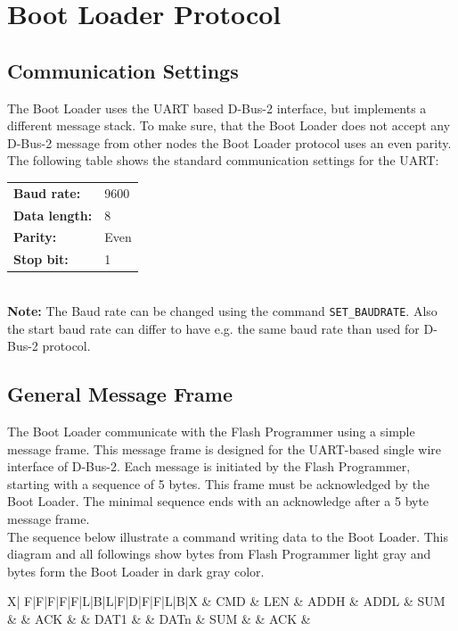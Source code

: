 \documentclass[a4paper,british,oneside,12pt]{scrartcl}
\newlength{\tabcolsepBak}
\newlength{\arrayrulewidthBak}
\newcommand{\mkMsgFrame}[4][]{
\setlength\tabcolsep{1pt}
\renewcommand\arraystretch{1.3}
\setlength\arrayrulewidth{1pt}
 \vspace{8pt}
 \noindent
 \begin{tabular}
   {X|#2|X}
  	\hline
  	& #3 &\tabularnewline
  	#4
  	#1
 \end{tabular}
 \vspace{8pt}
 \setlength\tabcolsep{\tabcolsepBak}
 \renewcommand\arraystretch{1.0}
 \setlength\arrayrulewidth{\arrayrulewidthBak}
}
\begin{document}



\newpage
\section{Boot Loader Protocol}
\label{sec:BootLoaderProtocol}
\subsection{Communication Settings}
The Boot Loader uses the UART based D-Bus-2 interface, but implements a different message stack. To make sure, that the Boot Loader does not accept any D-Bus-2 message from other nodes the Boot Loader protocol uses an even parity. The following table shows the standard communication settings for the UART:\\[0.5cm]
\noindent{}\sffamily
\begin{tabular}{ll}
		\textbf{Baud rate:}   & 9600\\
	  \textbf{Data length:} & 8\\		
		\textbf{Parity:}      & Even\\
		\textbf{Stop bit:}    & 1
\end{tabular}\\[0.5cm]
\normalfont
\textbf{Note:} The Baud rate can be changed using the command \texttt{SET_BAUDRATE}. Also the start baud rate can differ to have e.g. the same baud rate than used for D-Bus-2 protocol.
\pagebreak[0]
\normalfont

\subsection{General Message Frame}
\label{sec:BootLoaderMsgFrame}
The Boot Loader communicate with the Flash Programmer using a simple message frame. This message frame is designed for the UART-based single wire interface of D-Bus-2. Each message is initiated by the Flash Programmer, starting with a sequence of 5 bytes. This frame must be acknowledged by the Boot Loader. The minimal sequence ends with an acknowledge after a 5 byte message frame.\\
The sequence below illustrate a command writing data to the Boot Loader. This diagram and all followings show bytes from Flash Programmer light gray and bytes form the Boot Loader in dark gray color. 

\mkMsgFrame{%
  F|F|F|F|F|L|B|L|F|D|F|F|L|B}{%
  CMD & LEN & ADDH & ADDL & SUM & & ACK & & DAT1 & & DATn & SUM & & ACK}{%
  \cline{2-6}\cline{8-8}\cline{10-10}\cline{12-13} \cline{15-15}
}
\end{document}
